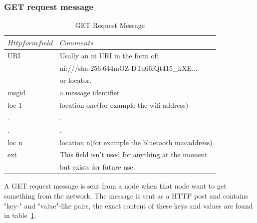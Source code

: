 \documentclass[11pt]{article}
\begin{document}


\subsubsection{GET request message}

\begin{table}[H]
\centering
\begin{tabular}{|l|l|}
\hline
$Http form field$&$Comments$\\

\hline

URI&Usally an ni URI in the form of:\\
 &ni:///sha-256;644mOZ-DTu66fQt415\_kXE...\\
 &or locator.\\
\hline
msgid&a message identifier\\
\hline
loc 1&location one(for example the wifi-address)\\
\hline
.&.\\
\hline
.&.\\
\hline
loc n&location n(for example the bluetooth macaddress)\\
\hline
ext&This field isn't used for anything at the moment\\
 &but exists for future use.\\
\hline
\end{tabular}
\caption{GET Request Message}
\label{table:tab3}
\end{table}

A GET request message is sent from a node when that node want to get something from the network. The message is sent as a HTTP post and contains "key-" and "value"-like pairs, the exact content of these keys and values are found in table~\ref{table:tab3}.


\end{document}
